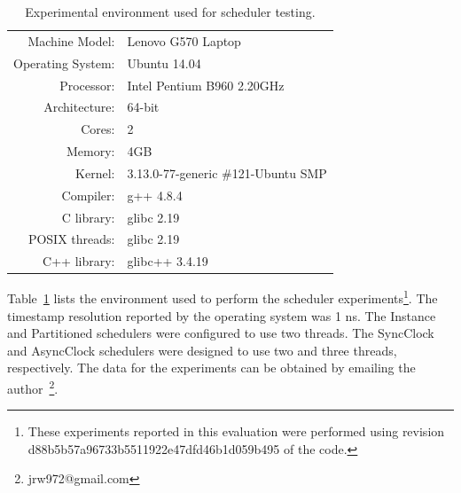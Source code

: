 \begin{table}
\center
\begin{tabular}{rl}
Machine Model:    & Lenovo G570 Laptop \\
Operating System: & Ubuntu 14.04 \\
Processor:        & Intel Pentium B960 2.20GHz \\
Architecture:     & 64-bit \\
Cores:            & 2 \\
Memory:           & 4GB \\
Kernel:           & 3.13.0-77-generic \#121-Ubuntu SMP \\
Compiler:         & g++ 4.8.4 \\
C library:        & glibc 2.19 \\
POSIX threads:    & glibc 2.19 \\
C++ library:      & glibc++ 3.4.19 \\
\end{tabular}
\caption{Experimental environment used for scheduler testing.\label{environment}}
\end{table}

Table~\ref{environment} lists the environment used to perform the scheduler experiments\footnote{These experiments reported in this evaluation were performed using revision d88b5b57a96733b5511922e47dfd46b1d059b495 of the code.}.
The timestamp resolution reported by the operating system was 1 ns.
The Instance and Partitioned schedulers were configured to use two threads.
The SyncClock and AsyncClock schedulers were designed to use two and three threads, respectively.
The data for the experiments can be obtained by emailing the author~\footnote{jrw972@gmail.com}.



